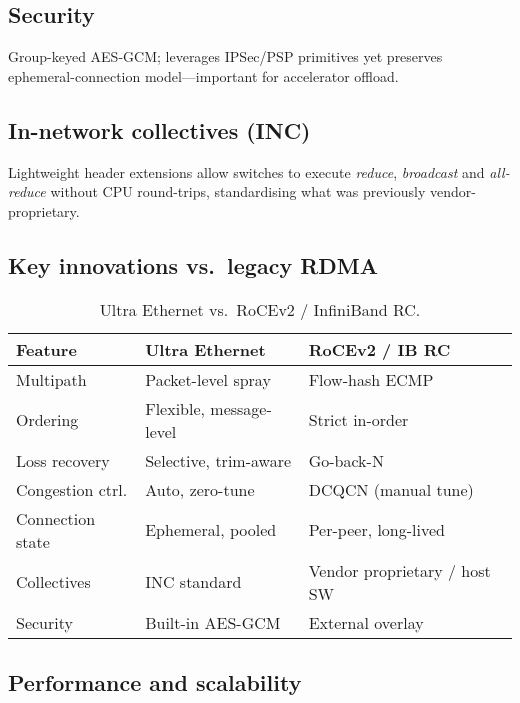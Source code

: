 \documentclass[../../../OAE-SPEC-MAIN.tex]{subfiles}
\begin{document}
\subsection*{Security}
Group-keyed AES-GCM; leverages IPSec/PSP primitives yet preserves
ephemeral-connection model—important for accelerator offload.

\subsection*{In-network collectives (INC)}
Lightweight header extensions allow switches to execute
\textit{reduce}, \textit{broadcast} and \textit{all-reduce} without CPU
round-trips, standardising what was previously vendor-proprietary.

\subsection{Key innovations vs.\ legacy RDMA}

\begin{table}[ht]
\footnotesize
\caption{Ultra Ethernet vs.\ RoCEv2 / InfiniBand RC.}
\begin{tabular}{@{}p{}p{}p{}@{}}
\toprule
\textbf{Feature} & \textbf{Ultra Ethernet} & \textbf{RoCEv2 / IB RC}\\\midrule
Multipath & Packet-level spray & Flow-hash ECMP\\
Ordering & Flexible, message-level & Strict in-order\\
Loss recovery & Selective, trim-aware & Go-back-N\\
Congestion ctrl. & Auto, zero-tune & DCQCN (manual tune)\\
Connection state & Ephemeral, pooled & Per-peer, long-lived\\
Collectives & INC standard & Vendor proprietary / host SW\\
Security & Built-in AES-GCM & External overlay\\
\bottomrule
\end{tabular}
\end{table}

\subsection{Performance and scalability}
\end{document}
